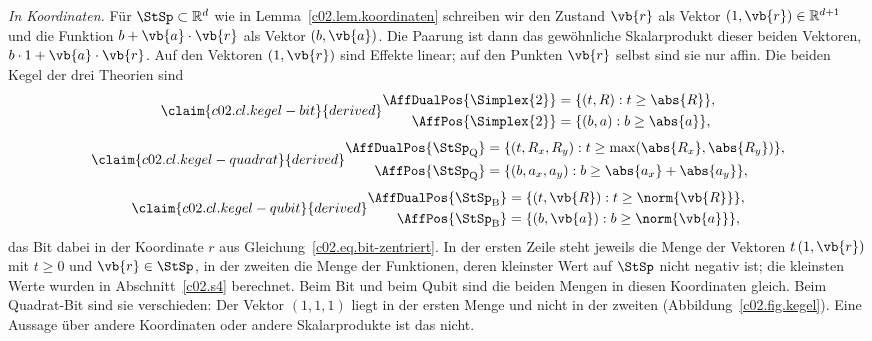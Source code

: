 \begin{vertiefung}
  \emph{In Koordinaten.} Für $\StSp \subset \mathbb{R}^d$ wie in
  Lemma~\ref{c02.lem.koordinaten} schreiben wir den Zustand $\vb{r}$ als Vektor
  $(1, \vb{r}) \in \mathbb{R}^{d+1}$ und die Funktion $b + \vb{a}\cdot\vb{r}$ als Vektor
  $(b, \vb{a})$. Die Paarung ist dann das gewöhnliche Skalarprodukt dieser beiden Vektoren,
  $b\cdot 1 + \vb{a}\cdot\vb{r}$. Auf den Vektoren $(1, \vb{r})$ sind Effekte linear; auf
  den Punkten $\vb{r}$ selbst sind sie nur affin. Die beiden Kegel der drei Theorien sind
  \begin{equation}\label{c02.eq.kegel-bit}\claim{c02.cl.kegel-bit}{derived}
    \begin{aligned}
      \AffDualPos{\Simplex{2}} &= \{ (t, R) : t \geq \abs{R} \}, \\
      \AffPos{\Simplex{2}} &= \{ (b, a) : b \geq \abs{a} \},
    \end{aligned}
  \end{equation}
  \begin{equation}\label{c02.eq.kegel-quadrat}\claim{c02.cl.kegel-quadrat}{derived}
    \begin{aligned}
      \AffDualPos{\StSp_{\mathrm{Q}}} &= \{ (t, R_x, R_y) : t \geq \max(\abs{R_x}, \abs{R_y}) \}, \\
      \AffPos{\StSp_{\mathrm{Q}}} &= \{ (b, a_x, a_y) : b \geq \abs{a_x} + \abs{a_y} \},
    \end{aligned}
  \end{equation}
  \begin{equation}\label{c02.eq.kegel-qubit}\claim{c02.cl.kegel-qubit}{derived}
    \begin{aligned}
      \AffDualPos{\StSp_{\mathrm{B}}} &= \{ (t, \vb{R}) : t \geq \norm{\vb{R}} \}, \\
      \AffPos{\StSp_{\mathrm{B}}} &= \{ (b, \vb{a}) : b \geq \norm{\vb{a}} \} ,
    \end{aligned}
  \end{equation}
  das Bit dabei in der Koordinate $r$ aus Gleichung~\eqref{c02.eq.bit-zentriert}.
  In der ersten Zeile steht jeweils die Menge der Vektoren $t\,(1, \vb{r})$ mit $t \geq 0$ und
  $\vb{r} \in \StSp$, in der zweiten die Menge der Funktionen, deren kleinster Wert auf $\StSp$
  nicht negativ ist; die kleinsten Werte wurden in Abschnitt~\ref{c02.s4} berechnet. Beim
  Bit und beim Qubit sind die beiden Mengen in diesen Koordinaten gleich. Beim Quadrat-Bit
  sind sie verschieden: Der Vektor $(1, 1, 1)$ liegt in der ersten Menge und nicht in der
  zweiten (Abbildung~\ref{c02.fig.kegel}). Eine Aussage über andere Koordinaten oder andere
  Skalarprodukte ist das nicht.


\end{vertiefung}
